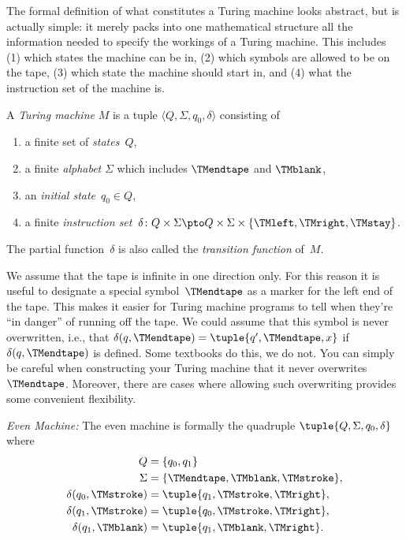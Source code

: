 \documentclass[../../../include/open-logic-section]{subfiles}
\begin{document}

\begin{explain}
The formal definition of what constitutes a Turing machine looks
abstract, but is actually simple: it merely packs into one
mathematical structure all the information needed to specify the
workings of a Turing machine. This includes (1) which states the
machine can be in, (2) which symbols are allowed to be on the tape, (3)
which state the machine should start in, and (4) what the instruction
set of the machine is.
\end{explain}

\begin{defn}
A \emph{Turing machine} $M$ is a tuple $\langle Q, \Sigma, q_0,
\delta\rangle$ consisting of
\begin{enumerate}
\item a finite set of \emph{states}~$Q$,
\item a finite \emph{alphabet} $\Sigma$ which includes $\TMendtape$ and
  $\TMblank$,
\item an \emph{initial state}~$q_0 \in Q$,
\item a finite \emph{instruction set}~$\delta\colon Q \times \Sigma
  \pto Q \times \Sigma \times \{\TMleft, \TMright, \TMstay\}$.
\end{enumerate}
The partial function~$\delta$ is also called the \emph{transition function}
of~$M$.
\end{defn}

\begin{explain}
We assume that the tape is infinite in one direction only. For this
reason it is useful to designate a special symbol~$\TMendtape$ as a
marker for the left end of the tape. This makes it easier for Turing
machine programs to tell when they're ``in danger'' of running off the
tape. We could assume that this symbol is never overwritten, i.e.,
that $\delta(q,\TMendtape) = \tuple{q', \TMendtape, x}$ if
$\delta(q,\TMendtape)$ is defined. Some textbooks do this, we do not.
You can simply be careful when constructing your Turing machine that
it never overwrites~$\TMendtape$.  Moreover, there are cases where
allowing such overwriting provides some convenient flexibility.
\end{explain}

\begin{ex}
\emph{Even Machine:} The even machine is formally
the quadruple $\tuple{Q, \Sigma, q_0, \delta}$ where
\begin{align*}
Q & = \{ q_0, q_1 \} \\
\Sigma & = \{ \TMendtape, \TMblank, \TMstroke \}, \\
\delta(q_0, \TMstroke) & = \tuple{q_1, \TMstroke, \TMright},\\
\delta(q_1, \TMstroke) & = \tuple{q_0, \TMstroke, \TMright},\\
\delta(q_1, \TMblank)  & = \tuple{q_1, \TMblank, \TMright}.
\end{align*}
\end{ex}
\end{document}
